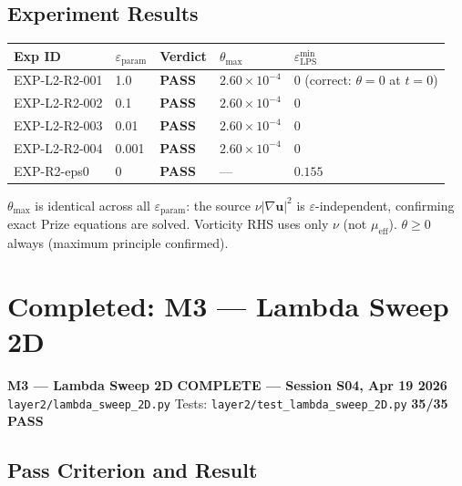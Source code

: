 \documentclass[11pt, a4paper]{article}
\theoremstyle{definition}
\theoremstyle{remark}
\newenvironment{milestone}{%
  \begin{tcolorbox}[colback=tfblue!5, colframe=tfblue!50!black,
    breakable, left=4pt, right=4pt, top=4pt, bottom=4pt]
}{%
  \end{tcolorbox}
}
\newcommand{\eps}{\varepsilon}
\newcommand{\PASS}{\textcolor{passgreen}{\textbf{PASS}}}
\newcommand{\thet}{\theta}
\newcommand{\mueff}{\mu_{\mathrm{eff}}}
\newcommand{\epslps}{\eps_{\mathrm{LPS}}}
\begin{document}
\subsection{Experiment Results}

\begin{center}
\begin{tabular}{lllll}
\toprule
\textbf{Exp ID} & \textbf{$\eps_{\mathrm{param}}$} & \textbf{Verdict} & \textbf{$\thet_{\max}$} & \textbf{$\epslps^{\min}$} \\
\midrule
EXP-L2-R2-001 & 1.0   & \PASS & $2.60\times10^{-4}$ & $0$ (correct: $\thet=0$ at $t=0$) \\
EXP-L2-R2-002 & 0.1   & \PASS & $2.60\times10^{-4}$ & $0$ \\
EXP-L2-R2-003 & 0.01  & \PASS & $2.60\times10^{-4}$ & $0$ \\
EXP-L2-R2-004 & 0.001 & \PASS & $2.60\times10^{-4}$ & $0$ \\
EXP-R2-eps0   & $0$   & \PASS & --- & $0.155$ \\
\bottomrule
\end{tabular}
\end{center}

$\thet_{\max}$ is identical across all $\eps_{\mathrm{param}}$: the source $\nu|\nabla\mathbf{u}|^2$
is $\eps$-independent, confirming exact Prize equations are solved. Vorticity RHS
uses only $\nu$ (not $\mueff$). $\thet \geq 0$ always (maximum principle confirmed).

\section{Completed: M3 --- Lambda Sweep 2D}

\begin{milestone}
  \textbf{M3 --- Lambda Sweep 2D}
  \hfill {\color{passgreen}\textbf{COMPLETE --- Session S04, Apr 19 2026}}\\[4pt]
  \texttt{layer2/lambda\_sweep\_2D.py} \quad Tests: \texttt{layer2/test\_lambda\_sweep\_2D.py}
  \quad \textbf{35/35 PASS}
\end{milestone}

\subsection{Pass Criterion and Result}
\end{document}
